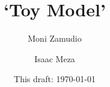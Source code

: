 \documentclass[10pt]{article}
\begin{document}
\title{`Toy Model'}

\author{ Moni Zamudio \and Isaac Meza}
\date{This draft: \today \\[2 cm] }

\maketitle




%
%
%
\end{document}
